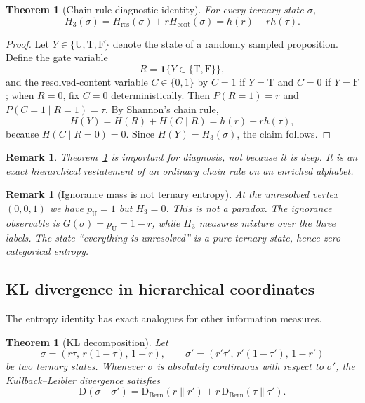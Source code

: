 \documentclass[11pt]{article}
\newtheorem{theorem}[definition]{Theorem}
\newtheorem{remark}[definition]{Remark}
\newcommand{\T}{\mathrm{T}}
\newcommand{\F}{\mathrm{F}}
\newcommand{\U}{\mathrm{U}}
\newcommand{\KL}{\mathrm{D}}
\newcommand{\1}{\mathbf{1}}
\newcommand{\hbin}{h}
\begin{document}
\begin{theorem}[Chain-rule diagnostic identity]
\label{thm:entropy-decomposition}
For every ternary state $\sigma$,
\begin{equation}
H_3(\sigma)=H_{\mathrm{res}}(\sigma)+r H_{\mathrm{cont}}(\sigma)=\hbin(r)+r\hbin(\tau).
\label{eq:entropy-decomposition}
\end{equation}
\end{theorem}

\begin{proof}
Let $Y\in\{\U,\T,\F\}$ denote the state of a randomly sampled proposition. Define the gate variable
\[
R=\1\{Y\in\{\T,\F\}\},
\]
and the resolved-content variable $C\in\{0,1\}$ by $C=1$ if $Y=\T$ and $C=0$ if $Y=\F$; when $R=0$, fix $C=0$ deterministically. Then $P(R=1)=r$ and $P(C=1\mid R=1)=\tau$. By Shannon's chain rule,
\[
H(Y)=H(R)+H(C\mid R)=\hbin(r)+r\hbin(\tau),
\]
because $H(C\mid R=0)=0$. Since $H(Y)=H_3(\sigma)$, the claim follows.
\end{proof}

\begin{remark}
Theorem~\ref{thm:entropy-decomposition} is important for diagnosis, not because it is deep. It is an exact hierarchical restatement of an ordinary chain rule on an enriched alphabet.
\end{remark}

\begin{remark}[Ignorance mass is not ternary entropy]
At the unresolved vertex $(0,0,1)$ we have $p_\U=1$ but $H_3=0$. This is not a paradox. The ignorance observable is $G(\sigma)=p_\U=1-r$, while $H_3$ measures mixture over the \emph{three labels}. The state “everything is unresolved” is a pure ternary state, hence zero categorical entropy.
\end{remark}

\subsection{KL divergence in hierarchical coordinates}

The entropy identity has exact analogues for other information measures.

\begin{theorem}[KL decomposition]
\label{thm:kl-decomposition}
Let
\[
\sigma=(r\tau,\,r(1-\tau),\,1-r),
\qquad
\sigma'=(r'\tau',\,r'(1-\tau'),\,1-r')
\]
be two ternary states. Whenever $\sigma$ is absolutely continuous with respect to $\sigma'$, the Kullback--Leibler divergence satisfies
\begin{equation}
\KL(\sigma\|\sigma')
=
\KL_{\mathrm{Bern}}(r\|r')
+
r\,\KL_{\mathrm{Bern}}(\tau\|\tau').
\label{eq:kl-decomposition}
\end{equation}
\end{theorem}
\end{document}
